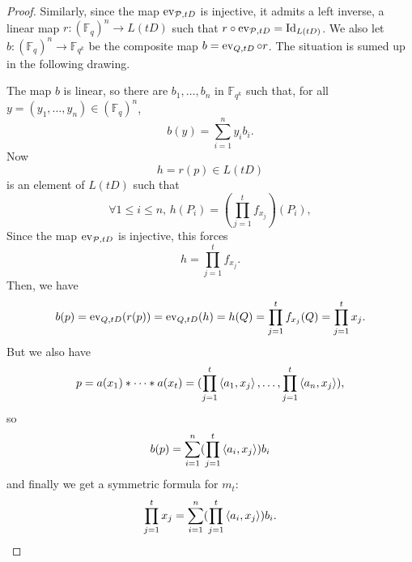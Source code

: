 \documentclass[11pt]{article}
\begin{document}
\begin{proof}
  Similarly, since the map $\operatorname{ev}_{\mathcal{P}, tD}$ is injective, it admits a left inverse, \ie a linear
  map $r: (\mathbb{F}_{q})^n \to L(tD)$
  such that $r\circ\operatorname{ev}_{\mathcal{P}, tD} = \operatorname{Id}_{L(tD)}$.
We also let $b: (\mathbb{F}_{q})^n \to \mathbb{F}_{q^k}$
  be the composite map $b = \operatorname{ev}_{Q, tD}\circ r$.   The situation is sumed up in the
  following drawing.
  \begin{center}
\end{center}
The map $b$ is linear, so there are $b_1, \dots, b_n$ in
  $\mathbb{F}_{q^k}$ such that, for all $y=(y_1, \dots, y_n)\in(\mathbb{F}_{q})^n$,
  \[
    b(y) = \sum_{i=1}^n y_i b_i.
  \]
Now
\[
  h = r(p)\in L(tD)
\]
is an element of $L(tD)$ such that
\[
  \forall 1\leq i\leq n,\,h(P_i) = (\prod_{j=1}^tf_{x_j})(P_i),
\]
Since the map $\operatorname{ev}_{\mathcal{P}, tD}$ is injective, this forces
\[
  h = \prod_{j=1}^tf_{x_j}.
\]
Then, we have
\begin{equation*}
b(p) = \operatorname{ev}_{Q, tD}(r(p))
  = \operatorname{ev}_{Q, tD}(h)
  = h(Q)
  = \prod_{j=1}^t f_{x_j}(Q)
  = \prod_{j=1}^t x_j.
\end{equation*}
But we also have
\begin{equation*}
    p = a(x_1)*\cdots*a(x_t)
    = (\prod_{j=1}^t\left\langle a_1,x_j\right\rangle, \dots, \prod_{j=1}^t\left\langle a_n,x_j\right\rangle),
 \end{equation*}
so
\[
  b(p) = \sum_{i=1}^n(\prod_{j=1}^t\left\langle a_i,x_j\right\rangle)b_i
\]
and finally we get a symmetric formula for $m_t$:
\[
  \prod_{j=1}^t x_j = \sum_{i=1}^n(\prod_{j=1}^t\left\langle a_i,x_j\right\rangle)b_i.
\]
\end{proof}
\end{document}
